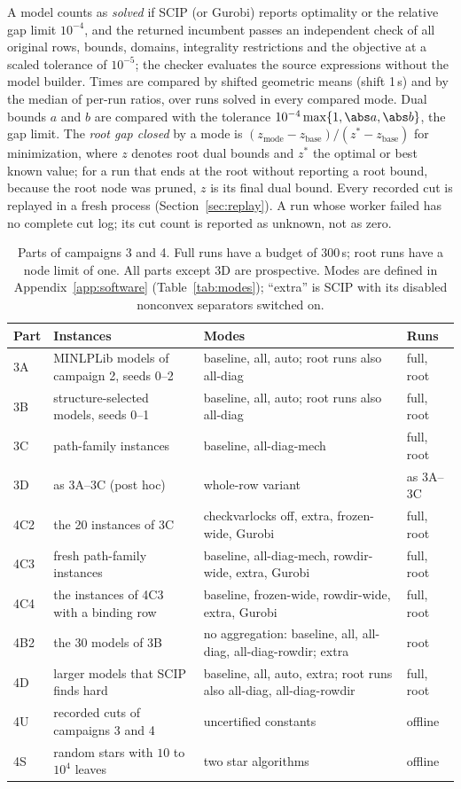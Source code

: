 A model counts as \emph{solved} if SCIP (or Gurobi) reports optimality or the
relative gap limit $10^{-4}$, and the returned incumbent passes an independent
check of all original rows, bounds, domains, integrality restrictions and the
objective at a scaled tolerance of $10^{-5}$; the checker evaluates the source
expressions without the model builder. Times are compared by shifted geometric
means (shift 1\,s) and by the median of per-run ratios, over runs solved in
every compared mode. Dual bounds $a$ and $b$ are compared with the tolerance
$10^{-4}\max\{1,\abs a,\abs b\}$, the gap limit. The \emph{root gap closed} by a
mode is $(z_{\text{mode}}-z_{\text{base}})/(z^\ast-z_{\text{base}})$ for
minimization, where $z$ denotes root dual bounds and $z^\ast$ the optimal or
best known value; for a run that ends at the root without reporting a root
bound, because the root node was pruned, $z$ is its final dual bound. Every recorded cut is replayed in a fresh process
(Section~\ref{sec:replay}). A run whose worker failed has no complete cut log;
its cut count is reported as unknown, not as zero.

\begin{table}[t]
\centering\footnotesize
\caption{Parts of campaigns 3 and 4. Full runs have a budget of 300\,s; root
runs have a node limit of one. All parts except 3D are prospective. Modes
are defined in Appendix~\ref{app:software} (Table~\ref{tab:modes}); ``extra''
is SCIP with its disabled nonconvex separators switched on.}\label{tab:overview}
\begin{tabular}{@{}l>{\raggedright\arraybackslash}p{}>{\raggedright\arraybackslash}p{}l@{}}
\toprule
Part & Instances & Modes & Runs\\
\midrule
3A & 30 MINLPLib models of campaign 2, seeds 0--2 & baseline, all, auto; root runs also all-diag & full, root\\
3B & 30 structure-selected models, seeds 0--1 & baseline, all, auto; root runs also all-diag & full, root\\
3C & 20 path-family instances & baseline, all-diag-mech & full, root\\
3D & as 3A--3C (post hoc) & whole-row variant & as 3A--3C\\
\midrule
4C2 & the 20 instances of 3C & checkvarlocks off, extra, frozen-wide, Gurobi & full, root\\
4C3 & 20 fresh path-family instances & baseline, all-diag-mech, rowdir-wide, extra, Gurobi & full, root\\
4C4 & the instances of 4C3 with a binding row & baseline, frozen-wide, rowdir-wide, extra, Gurobi & full, root\\
4B2 & the 30 models of 3B & no aggregation: baseline, all, all-diag, all-diag-rowdir; extra & root\\
4D & 20 larger models that SCIP finds hard & baseline, all, auto, extra; root runs also all-diag, all-diag-rowdir & full, root\\
4U & recorded cuts of campaigns 3 and 4 & uncertified constants & offline\\
4S & random stars with $10$ to $10^4$ leaves & two star algorithms & offline\\
\bottomrule
\end{tabular}
\end{table}
